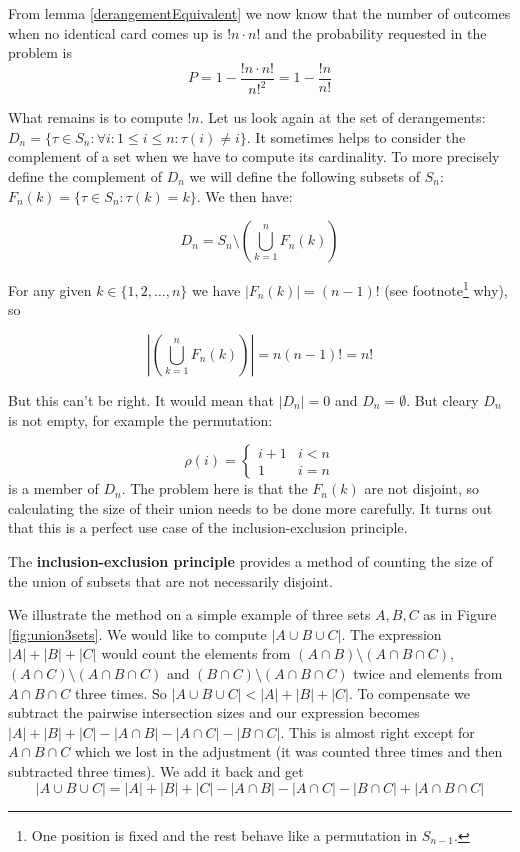 From lemma \ref{derangementEquivalent} we now know that the number of outcomes when no identical card comes up is $!n \cdot n!$ and the probability requested in the problem is 
$$
P = 1 - \frac{!n \cdot n!}{n!^2} = 1 - \frac{!n}{n!}
$$

What remains is to compute $!n$. Let us look again at the set of derangements: $D_n = \{\tau \in S_n: \forall i: 1 \leq i \leq n: \tau(i) \neq i \}$. It sometimes helps to consider the complement of a set when we have to compute its cardinality. To more precisely define the complement of $D_n$ we will define the following subsets of $S_n$:  $F_n(k) = \{\tau \in S_n: \tau(k) = k \}$. We then have:

$$
D_n = S_n \setminus (\bigcup_{k = 1}^n F_n(k))
$$

For any given $k \in \{1, 2, \ldots, n\}$ we have $|F_n(k)| = (n-1)!$ (see footnote\footnote{One position is fixed and the rest behave like a permutation in $S_{n-1}$.} why), so

$$
|(\bigcup_{k = 1}^n F_n(k))| = n (n-1)! = n!
$$

But this can't be right. It would mean that $|D_n|=0$ and $D_n = \emptyset$. But cleary $D_n$ is not empty, for example the permutation:

$$
\rho(i) = \begin{cases}
   i + 1 & i < n \\
   1     & i = n
   \end{cases}
$$
is a member of $D_n$. The problem here is that the $F_n(k)$ are not disjoint, so calculating the size of their union needs to be done more carefully. It turns out that this is a perfect use case of the inclusion-exclusion principle. 

The \textbf{inclusion-exclusion principle} provides a method of counting the size of the union of subsets that are not necessarily disjoint.

We illustrate the method on a simple example of three sets $A, B, C$ as in Figure \ref{fig:union3sets}. We would like to compute $|A \cup B \cup C|$. The expression $|A| + |B| + |C|$ would count the elements from $(A \cap B) \setminus (A \cap B \cap C)$, $(A \cap C) \setminus (A \cap B \cap C)$ and $(B \cap C) \setminus (A \cap B \cap C)$ twice and elements from $A \cap B \cap C$ three times. So $|A \cup B \cup C| < |A| + |B| + |C|$. To compensate we subtract the pairwise intersection sizes and our expression becomes $|A| + |B| + |C| - |A \cap B| - |A \cap C| - |B \cap C|$. This is almost right except for $A \cap B \cap C$ which we lost in the adjustment (it was counted three times and then subtracted three times). We add it back and get
$$
|A \cup B \cup C| = |A| + |B| + |C| - |A \cap B| - |A \cap C| - |B \cap C| + |A \cap B \cap C|
$$

